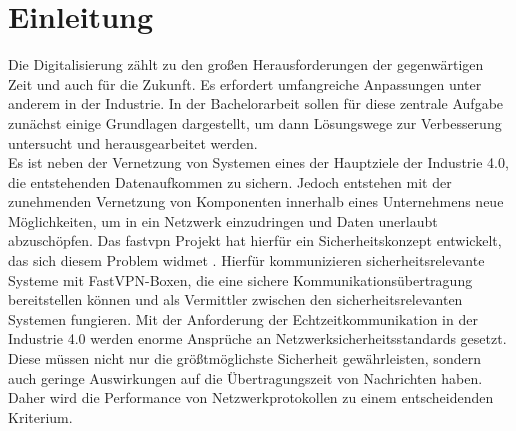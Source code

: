 \chapter{Einleitung}
\label{sec:intro}

Die Digitalisierung zählt zu den großen Herausforderungen der gegenwärtigen Zeit und auch für die Zukunft. Es erfordert umfangreiche Anpassungen unter anderem in der Industrie.
In der Bachelorarbeit sollen für diese zentrale Aufgabe zunächst einige Grundlagen dargestellt, um dann Lösungswege zur Verbesserung untersucht und herausgearbeitet werden.\\
Es ist neben der Vernetzung von Systemen eines der Hauptziele der Industrie 4.0, die entstehenden Datenaufkommen zu sichern. Jedoch entstehen mit der zunehmenden Vernetzung von Komponenten innerhalb eines Unternehmens neue Möglichkeiten, um in ein Netzwerk einzudringen und Daten unerlaubt abzuschöpfen. Das fastvpn Projekt hat hierfür ein Sicherheitskonzept entwickelt, das sich diesem Problem widmet \cite{fastvpn2018}.
Hierfür kommunizieren sicherheitsrelevante Systeme mit FastVPN-Boxen, die eine sichere Kommunikationsübertragung bereitstellen können und als Vermittler zwischen den sicherheitsrelevanten Systemen fungieren. 
Mit der Anforderung der Echtzeitkommunikation in der Industrie 4.0 werden enorme Ansprüche an Netzwerksicherheitsstandards gesetzt. Diese müssen nicht nur die größtmöglichste Sicherheit gewährleisten, sondern auch geringe Auswirkungen auf die Übertragungszeit von Nachrichten haben. Daher wird die Performance von Netzwerkprotokollen zu einem entscheidenden Kriterium. 
\\
